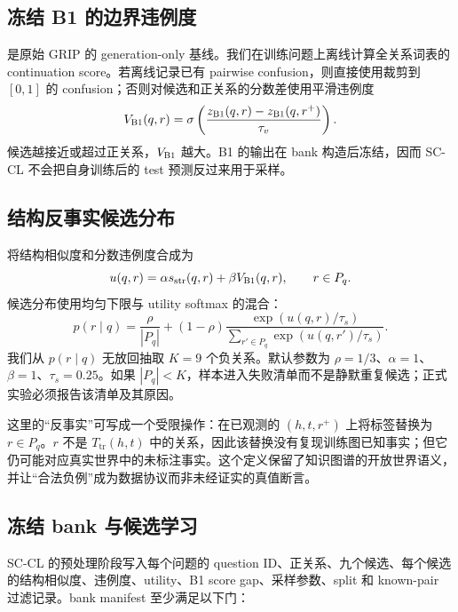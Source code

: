 \subsection{冻结 B1 的边界违例度}

\bone{} 是原始 GRIP 的 generation-only 基线。我们在训练问题上离线计算全关系词表的 continuation score。若离线记录已有 pairwise confusion，则直接使用裁剪到 $[0,1]$ 的 confusion；否则对候选和正关系的分数差使用平滑违例度
\begin{equation}
    V_{\textsc{B1}}(q,r)=\sigma\left(\frac{z_{\textsc{B1}}(q,r)-z_{\textsc{B1}}(q,r^+)}{\tau_v}\right).
    \label{eq:violation}
\end{equation}
候选越接近或超过正关系，$V_{\textsc{B1}}$ 越大。B1 的输出在 bank 构造后冻结，因而 SC-CL 不会把自身训练后的 test 预测反过来用于采样。

\subsection{结构反事实候选分布}

将结构相似度和分数违例度合成为
\begin{equation}
    u(q,r)=\alpha s_{\mathrm{str}}(q,r)+\beta V_{\textsc{B1}}(q,r),
    \qquad r\in P_q.
    \label{eq:utility}
\end{equation}
候选分布使用均匀下限与 utility softmax 的混合：
\begin{equation}
    p(r\mid q)=\frac{\rho}{|P_q|}+(1-\rho)
    \frac{\exp(u(q,r)/\tau_s)}{\sum_{r'\in P_q}\exp(u(q,r')/\tau_s)}.
    \label{eq:sampling}
\end{equation}
我们从 $p(r\mid q)$ 无放回抽取 $K=9$ 个负关系。默认参数为 $\rho=1/3$、$\alpha=1$、$\beta=1$、$\tau_s=0.25$。如果 $|P_q|<K$，样本进入失败清单而不是静默重复候选；正式实验必须报告该清单及其原因。

这里的“反事实”可写成一个受限操作：在已观测的 $(h,t,r^+)$ 上将标签替换为 $r\in P_q$。$r$ 不是 $T_{\mathrm{tr}}(h,t)$ 中的关系，因此该替换没有复现训练图已知事实；但它仍可能对应真实世界中的未标注事实。这个定义保留了知识图谱的开放世界语义，并让“合法负例”成为数据协议而非未经证实的真值断言。

\subsection{冻结 bank 与候选学习}

SC-CL 的预处理阶段写入每个问题的 question ID、正关系、九个候选、每个候选的结构相似度、违例度、utility、B1 score gap、采样参数、split 和 known-pair 过滤记录。bank manifest 至少满足以下门：

